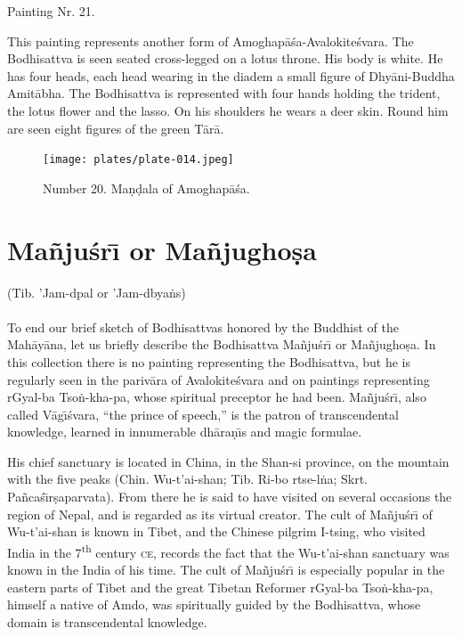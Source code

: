 \documentclass[a4paper, 12pt, oneside]{article}
\begin{document}
Painting Nr. 21.

\bigskip

This painting represents another form of Amoghap\={a}\'{s}a-Avalokite\'{s}vara. The Bodhisattva is seen seated cross-legged on a lotus throne. His body is white. He has four heads, each head wearing in the diadem a small figure of Dhy\={a}ni-Buddha Amit\={a}bha. The Bodhisattva is represented with four hands holding the trident, the lotus flower and the lasso. On his shoulders he wears a deer skin. Round him are seen eight figures of the green T\={a}r\={a}.

\clearpage
\vspace*{\fill}
\begin{figure}[H]
\centering
\texttt{[image: plates/plate-014.jpeg]}
\caption*{Number 20. Ma\d{n}\d{d}ala of Amoghap\={a}\'{s}a.}
\end{figure}
\vspace*{\fill}
\clearpage
\section{Ma\~{n}ju\'{s}r\={\i} or Ma\~{n}jugho\d{s}a}
\begin{center}
(Tib. 'Jam-dpal or 'Jam-dbya\.{n}s)
\end{center}
\paragraph{}
To end our brief sketch of Bodhisattvas honored by the Buddhist of the Mah\={a}y\={a}na, let us briefly describe the Bodhisattva Ma\~{n}ju\'{s}r\={\i} or Ma\~{n}jugho\d{s}a. In this collection there is no painting representing the Bodhisattva, but he is regularly seen in the pariv\={a}ra of Avalokite\'{s}vara and on paintings representing rGyal-ba Tso\.{n}-kha-pa, whose spiritual preceptor he had been. Ma\~{n}ju\'{s}r\={\i}, also called V\={a}g\={\i}\'{s}vara, ``the prince of speech,'' is the patron of transcendental knowledge, learned in innumerable dh\={a}ra\d{n}\={\i}s and magic formulae.

His chief sanctuary is located in China, in the Shan-si province, on the mountain with the five peaks (Chin. Wu-t'ai-shan; Tib. Ri-bo rtse-l\.{n}a; Skrt. Pa\~{n}ca\'{s}\={\i}r\d{s}aparvata). From there he is said to have visited on several occasions the region of Nepal, and is regarded as its virtual creator. The cult of Ma\~{n}ju\'{s}r\={\i} of Wu-t'ai-shan is known in Tibet, and the Chinese pilgrim I-tsing, who visited India in the 7\textsuperscript{th} century \textsc{ce}, records the fact that the Wu-t'ai-shan sanctuary was known in the India of his time. The cult of Ma\~{n}ju\'{s}r\={\i} is especially popular in the eastern parts of Tibet and the great Tibetan Reformer rGyal-ba Tso\.{n}-kha-pa, himself a native of Amdo, was spiritually guided by the Bodhisattva, whose domain is transcendental knowledge.
\end{document}
